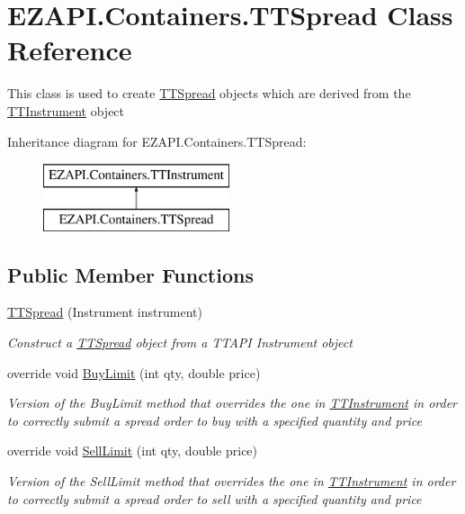 \hypertarget{class_e_z_a_p_i_1_1_containers_1_1_t_t_spread}{\section{E\-Z\-A\-P\-I.\-Containers.\-T\-T\-Spread Class Reference}
\label{class_e_z_a_p_i_1_1_containers_1_1_t_t_spread}
}


This class is used to create \hyperlink{class_e_z_a_p_i_1_1_containers_1_1_t_t_spread}{T\-T\-Spread} objects which are derived from the \hyperlink{class_e_z_a_p_i_1_1_containers_1_1_t_t_instrument}{T\-T\-Instrument} object  


Inheritance diagram for E\-Z\-A\-P\-I.\-Containers.\-T\-T\-Spread\-:\begin{figure}[H]
\begin{center}
\leavevmode
\includegraphics[height=2.000000cm]{class_e_z_a_p_i_1_1_containers_1_1_t_t_spread}
\end{center}
\end{figure}
\subsection*{Public Member Functions}
\begin{DoxyCompactItemize}
\item 
\hyperlink{class_e_z_a_p_i_1_1_containers_1_1_t_t_spread_a3bf18671ab168364d74312d8a8293b12}{T\-T\-Spread} (Instrument instrument)
\begin{DoxyCompactList}\small\item\em Construct a \hyperlink{class_e_z_a_p_i_1_1_containers_1_1_t_t_spread}{T\-T\-Spread} object from a T\-T\-A\-P\-I Instrument object \end{DoxyCompactList}\item 
override void \hyperlink{class_e_z_a_p_i_1_1_containers_1_1_t_t_spread_ac6db55861ecc59935f528473b8beaf4a}{Buy\-Limit} (int qty, double price)
\begin{DoxyCompactList}\small\item\em Version of the Buy\-Limit method that overrides the one in \hyperlink{class_e_z_a_p_i_1_1_containers_1_1_t_t_instrument}{T\-T\-Instrument} in order to correctly submit a spread order to buy with a specified quantity and price \end{DoxyCompactList}\item 
override void \hyperlink{class_e_z_a_p_i_1_1_containers_1_1_t_t_spread_a142bfd3762610e8970b9e63a7ddc1dba}{Sell\-Limit} (int qty, double price)
\begin{DoxyCompactList}\small\item\em Version of the Sell\-Limit method that overrides the one in \hyperlink{class_e_z_a_p_i_1_1_containers_1_1_t_t_instrument}{T\-T\-Instrument} in order to correctly submit a spread order to sell with a specified quantity and price \end{DoxyCompactList}\end{DoxyCompactItemize}
